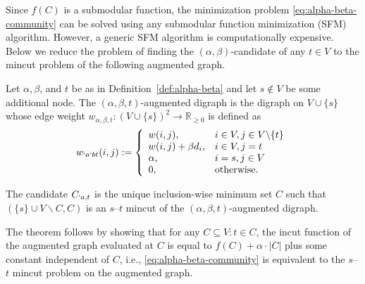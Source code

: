 Since $f(C)$ is a submodular function, the minimization problem \eqref{eq:alpha-beta-community} can be solved using any submodular function
minimization (SFM) algorithm. However, a generic SFM algorithm is computationally expensive. Below we reduce the problem of finding the $(\alpha,\beta)$-candidate of any $t\in V$ to the  
mincut problem of the following augmented graph.
\begin{definition}
	\label{def:augmented}
	Let $\alpha, \beta$, and $t$ be as in Definition~\ref{def:alpha-beta} and let $s \notin V$ be
	some additional node.
	The
	$(\alpha,\beta,t)$-augmented digraph is the digraph on $V \cup \{s\}$  whose edge weight $w_{\alpha,\beta,t}: (V\cup \{s\})^{2} \rightarrow
	\mathbb{R}_{\geq 0}$ is defined as
	\begin{align}
		w_{`a`b t}(i,j):= \left\{
			\begin{array}{ll}
				w(i,j), & i\in V, j\in V\backslash \{t\} \\
				w(i,j) + \beta d_{i}, & i\in V, j = t  \\
				\alpha, & i = s, j \in V \\
				0, & \text{otherwise}.
			\end{array}
			\right .
	\end{align}
\end{definition}

\begin{theorem}
  \label{thm:mc}
	The candidate $C_{`a,t}$ is the unique inclusion-wise minimum set $C$ such that $(\{s\}\cup
	V\backslash C, C)$ is an $s$--$t$ mincut of the $(\alpha,\beta,t)$-augmented digraph.
\end{theorem}

\begin{Proof}[Sketch]
  The theorem follows by showing that for any $C\subseteq V:t\in C$, the incut function of the
  augmented graph evaluated at $C$ is equal to
  $f(C) + \alpha \! \cdot \! |C|$ plus some constant independent of $C$, i.e., \eqref{eq:alpha-beta-community} is
  equivalent to the $s$--$t$ mincut
  problem on the augmented graph.
\end{Proof}


